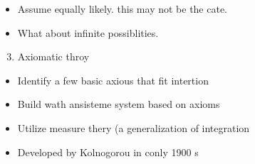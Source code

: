 \begin{itemize}
  \item[-] Assume equally likely. this may not be the cate.
  \item[-] What about infinite possiblities.
\end{itemize}

\begin{enumerate}
  \setcounter{enumi}{2}
  \item Axiomatic throy
\end{enumerate}

\begin{itemize}
  \item[-] Identify a few basic axious that fit intertion
  \item[-] Build wath ansisteme system based on axioms
  \item[-] Utilize measure thery (a generalization of integration
  \item[-] Developed by Kolnogorou in conly 1900 s
\end{itemize}

